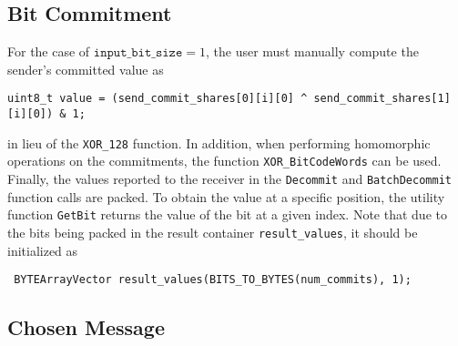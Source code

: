 \subsection{Bit Commitment}

For the case of $\texttt{input\_bit\_size} =1$, the user must manually compute the sender's committed value as 
\begin{lstlisting}     
uint8_t value = (send_commit_shares[0][i][0] ^ send_commit_shares[1][i][0]) & 1;
\end{lstlisting}
in lieu of the \texttt{XOR\_128} function. In addition, when performing homomorphic operations on the commitments, the function \texttt{XOR\_BitCodeWords} can be used. Finally, the values reported to the receiver in the \texttt{Decommit} and \texttt{BatchDecommit} function calls are packed. To obtain the value at a specific position, the utility function \texttt{GetBit} returns the value of the bit at a given index. Note that due to the bits being packed in the result container \texttt{result\_values}, it should be initialized as
\begin{lstlisting}     
 BYTEArrayVector result_values(BITS_TO_BYTES(num_commits), 1);
\end{lstlisting}

\subsection{Chosen Message}

